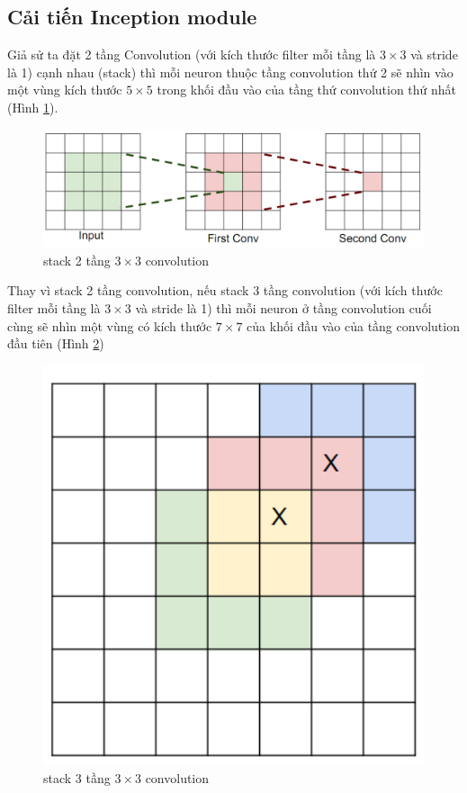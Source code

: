 \documentclass[a4paper,12pt]{report}
\begin{document}
\subsection{Cải tiến Inception module \cite{slidesangdv}}
\par Giả sử ta đặt 2 tầng Convolution (với kích thước filter mỗi tầng là $3 \times 3$ và stride là 1) cạnh nhau (stack) thì mỗi neuron thuộc tầng convolution thứ 2 sẽ nhìn vào một vùng kích thước $5 \times 5$ trong khối đầu vào của tầng thứ convolution thứ nhất (Hình \ref{fig_2conv3x3}). 
\begin{figure}[H]
\includegraphics[scale=0.5]{2conv3x3.png}
\caption{stack 2 tầng $3 \times 3$ convolution}
\label{fig_2conv3x3}
\end{figure}
\par Thay vì stack 2 tầng convolution, nếu stack 3 tầng convolution (với kích thước filter mỗi tầng là $3 \times 3$ và stride là 1) thì mỗi neuron ở tầng convolution cuối cùng sẽ nhìn một vùng có kích thước $7 \times 7$ của khối đầu vào của tầng convolution đầu tiên (Hình \ref{fig_3conv3x3})
\begin{figure}[H]
\centering
\includegraphics[scale=0.4]{3conv3x3.png}
\caption{stack 3 tầng $3 \times 3$ convolution}
\label{fig_3conv3x3}
\end{figure}
\end{document}
